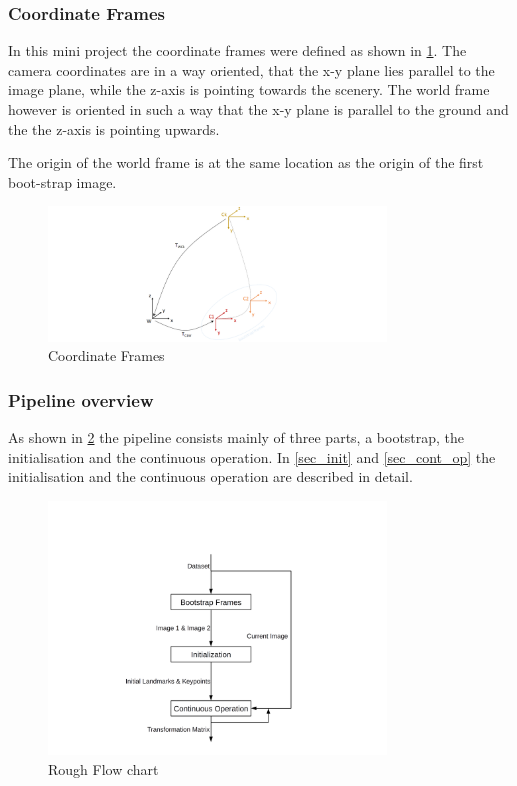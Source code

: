 \documentclass[a4paper,10pt]{article} %
\begin{document}
\subsubsection{Coordinate Frames}
In this mini project the coordinate frames were defined as shown in \cref{img_coord_frames}. The camera coordinates are in a way oriented, that the x-y plane lies parallel to the image plane, while the z-axis is pointing towards the scenery. The world frame however is oriented in such a way that the x-y plane is parallel to the ground and the the z-axis is pointing upwards.

The origin of the world frame is at the same location as the origin of the first boot-strap image.

\begin{figure}[ht]
	\includegraphics[width=0.8\textwidth]{coord_frames}
	\caption{Coordinate Frames}
	\label{img_coord_frames}
\end{figure}




\subsubsection{Pipeline overview}

As shown in \cref{img_flow_rough} the pipeline consists mainly of three parts, a bootstrap, the initialisation and the continuous operation. In \cref{sec_init} and \cref{sec_cont_op} the initialisation and the continuous operation are described in detail.

\begin{figure}[ht]
	\includegraphics[width=0.8\textwidth]{rough_flow}
	\caption{Rough Flow chart}
	\label{img_flow_rough}
\end{figure}
%
\end{document}
